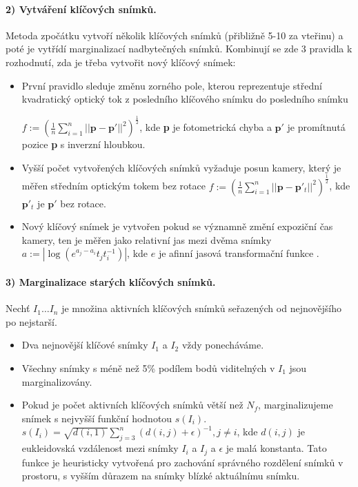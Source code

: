\documentclass[12pt,a4paper]{report}
\begin{document}
\paragraph*{2) Vytváření klíčových snímků.} Metoda zpočátku vytvoří několik klíčových snímků (přibližně 5-10 za vteřinu) a poté je vytřídí marginalizací nadbytečných snímků. Kombinují se zde 3 pravidla k rozhodnutí, zda je třeba vytvořit nový klíčový snímek:
\begin{itemize}
\item První pravidlo sleduje změnu zorného pole, kterou reprezentuje střední kvadratický optický tok z posledního klíčového snímku do posledního snímku
 
\( f:=(\frac{1}{n}\sum_{i=1}^n||\textbf{p}-\textbf{p}'||^2)^\frac{1}{2} \), kde \textbf{p} je fotometrická chyba a \(\textbf{p}'\) je promítnutá pozice \textbf{p} s inverzní hloubkou.

\item Vyšší počet vytvořených klíčových snímků vyžaduje posun kamery, který je měřen středním optickým tokem bez rotace \( f:=(\frac{1}{n}\sum_{i=1}^n||\textbf{p}-\textbf{p}'_t||^2)^\frac{1}{2} \), kde \(\textbf{p}'_t\) je \(\textbf{p}'\) bez rotace.

\item Nový klíčový snímek je vytvořen pokud se významně změní expoziční čas kamery, ten je měřen jako relativní jas mezi dvěma snímky \( a:=|\log(e^{a_j-a_i} t_j t_i^{-1})| \), kde \( e \) je afinní jasová transformační funkce \cite{Engel2018_DSO}.
\end{itemize}


\paragraph*{3) Marginalizace starých klíčových snímků.} Nechť \( I_1 \dots I_n \) je množina aktivních klíčových snímků seřazených od nejnovějšího po nejstarší.
\begin{itemize}
\item Dva nejnovější klíčové snímky \( I_1 \) a \( I_2 \) vždy ponecháváme.
\item Všechny snímky s méně než 5\% podílem bodů viditelných v \( I_1 \) jsou marginalizovány.
\item Pokud je počet aktivních klíčových snímků větší než \( N_f \), marginalizujeme snímek s nejvyšší funkční hodnotou \( s(I_i) \). \( s(I_i)=\sqrt{d(i,1)} \sum_{j=3}^n (d(i,j)+\epsilon)^{-1}, j\neq i \), kde \( d(i,j) \) je eukleidovská vzdálenost mezi snímky \( I_i \) a \( I_j \) a \( \epsilon \) je  malá konstanta. Tato funkce je heuristicky vytvořená pro zachování správného rozdělení snímků v prostoru, s vyšším důrazem na snímky blízké aktuálnímu snímku.
\end{itemize}
\end{document}
